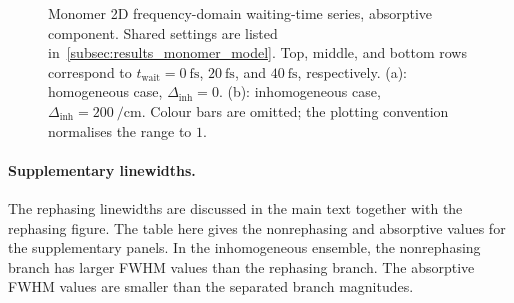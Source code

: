 \begin{figure}[htbp]
    \centering
    \caption{Monomer 2D frequency-domain waiting-time series, absorptive
    component. Shared settings are listed
    in~\autoref{subsec:results_monomer_model}. Top, middle, and bottom rows correspond to
    \(t_{\mathrm{wait}}=\SI{0}{\femto\second}\),
    \(\SI{20}{\femto\second}\), and \(\SI{40}{\femto\second}\),
    respectively. (a): homogeneous case,
    \(\Delta_{\mathrm{inh}}=0\). (b): inhomogeneous case,
    \(\Delta_{\mathrm{inh}}=\SI{200}{\per\centi\metre}\). Colour bars are
    omitted; the plotting convention normalises the range to \(1\).}
    \label{fig:app_monomer_2d_freq_hom_inhom_absorptive}
\end{figure}

\paragraph{Supplementary linewidths.}
The rephasing linewidths are discussed in the main text together with the
rephasing figure. The table here gives the nonrephasing and absorptive values
for the supplementary panels. In the inhomogeneous ensemble, the nonrephasing
branch has larger FWHM values than the rephasing branch. The absorptive FWHM
values are smaller than the separated branch magnitudes.

